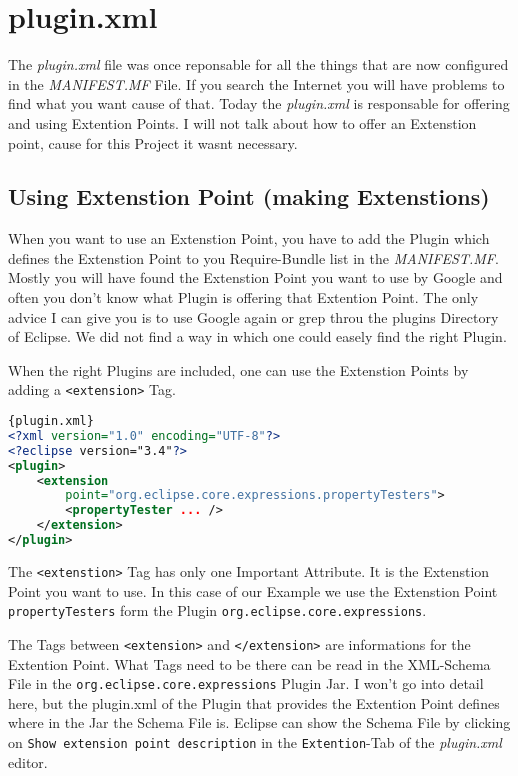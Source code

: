 \documentclass[a4paper,10pt]{report}
\begin{document}
\section{plugin.xml}
The {\it plugin.xml} file was once reponsable for all the things that are now configured in the {\it MANIFEST.MF} File. If you search the Internet you will have problems to find what you want cause of that. Today the {\it plugin.xml} is responsable for offering and using Extention Points. I will not talk about how to offer an Extenstion point, cause for this Project it wasnt necessary.

\subsection{Using Extenstion Point (making Extenstions)}
When you want to use an Extenstion Point, you have to add the Plugin which defines the Extenstion Point to you Require-Bundle list in the {\it MANIFEST.MF}. Mostly you will have found the Extenstion Point you want to use by Google and often you don't know what Plugin is offering that Extention Point. The only advice I can give you is to use Google again or grep throu the plugins Directory of Eclipse. We did not find a way in which one could easely find the right Plugin.

When the right Plugins are included, one can use the Extenstion Points by adding a \verb!<extension>! Tag.
\begin{lstlisting}[language=XML,caption=Use Extenstion Point ({\it plugin.xml})]{plugin.xml}
<?xml version="1.0" encoding="UTF-8"?>
<?eclipse version="3.4"?>
<plugin>
 	<extension 
	    point="org.eclipse.core.expressions.propertyTesters">
   		<propertyTester ... />
 	</extension>
</plugin>
\end{lstlisting}

The \verb!<extenstion>! Tag has only one Important Attribute. It is the Extenstion Point you want to use. In this case of our Example we use the Extenstion Point \verb!propertyTesters! form the Plugin \verb!org.eclipse.core.expressions!.

The Tags between \verb!<extension>! and \verb!</extension>! are informations for the Extention Point. What Tags need to be there can be read in the XML-Schema File in the \verb!org.eclipse.core.expressions! Plugin Jar. I won't go into detail here, but the plugin.xml of the Plugin that provides the Extention Point defines where in the Jar the Schema File is. Eclipse can show the Schema File by clicking on \verb!Show extension point description! in the \verb!Extention!-Tab of the {\it plugin.xml} editor.
\end{document}
